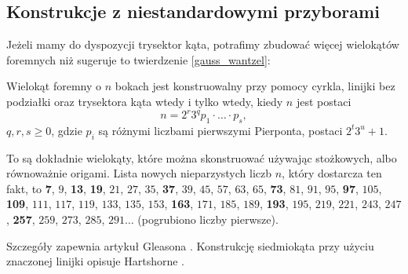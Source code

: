 \subsection{Konstrukcje z niestandardowymi przyborami}
Jeżeli mamy do dyspozycji trysektor kąta, potrafimy zbudować więcej wielokątów foremnych niż sugeruje to twierdzenie \ref{gauss_wantzel}:

\begin{proposition}
    Wielokąt foremny o $n$ bokach jest konstruowalny przy pomocy cyrkla, linijki bez podziałki oraz trysektora kąta wtedy i tylko wtedy, kiedy $n$ jest postaci
    \begin{equation}
        n = 2^r 3^q p_1 \cdot \ldots \cdot p_s,
    \end{equation}
    $q, r, s \ge 0$, gdzie $p_i$ są różnymi liczbami pierwszymi Pierponta, postaci $2^t3^u + 1$.
\end{proposition}

To są dokładnie wielokąty, które można skonstruować używając stożkowych, albo równoważnie origami.
Lista nowych nieparzystych liczb $n$, który dostarcza ten fakt, to \textbf{7}, $9$, \textbf{13}, \textbf{19}, $21$, $27$, $35$, \textbf{37}, $39$, $45$, $57$, $63$, $65$, \textbf{73}, $81$, $91$, $95$, \textbf{97}, $105$, \textbf{109}, $111$, $117$, $119$, $133$, $135$, $153$, \textbf{163}, $171$, $185$, $189$, \textbf{193}, $195$, $219$, $221$, $243$, $247$, \textbf{257}, $259$, $273$, $285$, $291\ldots$ (pogrubiono liczby pierwsze).

Szczegóły zapewnia artykuł Gleasona \cite{gleason_1988}.
%
Konstrukcję siedmiokąta przy użyciu znaczonej linijki opisuje Hartshorne .
